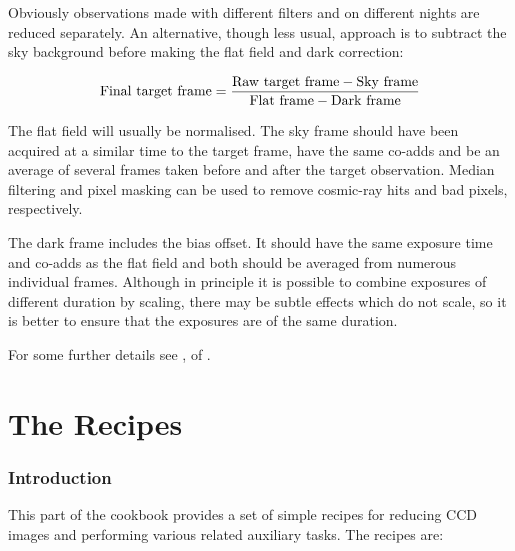 \documentclass[twoside,11pt]{starlink}
\begin{document}
Obviously observations made with different filters and on different nights
are reduced separately.  An alternative, though less usual, approach is to
subtract the sky background before making the flat field and dark
correction:

\begin{equation}
{\rm Final~target~frame} =
\frac {{\rm Raw~target~frame} - {\rm Sky~frame}}
{{\rm Flat~frame} - {\rm Dark~frame}}
\end{equation}

The flat field will usually be normalised.  The sky frame should have
been acquired at a similar time to the target frame, have the same co-adds
and be an average of several frames taken before and after the target
observation.  Median filtering and pixel masking can be used to remove
cosmic-ray hits and bad pixels, respectively.

The dark frame includes the bias offset.  It should have the same exposure
time and co-adds as the flat field and both should be averaged from
numerous individual frames.  Although in  principle it is possible to
combine exposures of different duration by scaling, there may be subtle
effects which do not scale, so it is better to ensure that the exposures
are of the same duration.

For some further details see
,
of \/\cite{SUN139}.


\cleardoublepage

\part{The Recipes}

\section{\label{SUMEX}Introduction}

This part of the cookbook provides a set of simple recipes for reducing
CCD images and performing various related auxiliary tasks.  The
recipes are:
\end{document}
